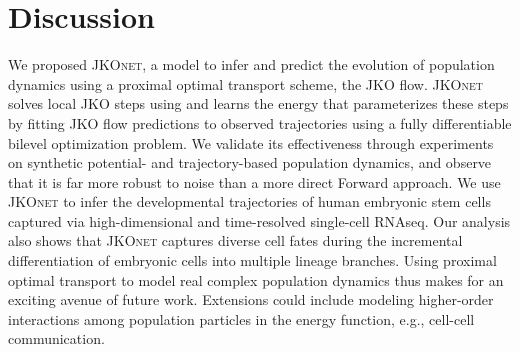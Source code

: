 \section{Discussion}
We proposed \textsc{JKOnet}, a model to infer and predict the evolution of population dynamics using a proximal optimal transport scheme, the \acrshort{JKO} flow.
\textsc{JKOnet} solves local \acrshort{JKO} steps using  and learns the energy that parameterizes these steps by fitting \acrshort{JKO} flow predictions to observed trajectories using a fully differentiable bilevel optimization problem.
We validate its effectiveness through experiments on synthetic potential- and trajectory-based population dynamics, and observe that it is far more robust to noise than a more direct Forward approach. We use \textsc{JKOnet} to infer the developmental trajectories of human embryonic stem cells captured via high-dimensional and time-resolved single-cell RNAseq. 
Our analysis also shows that \textsc{JKOnet} captures diverse cell fates during the incremental differentiation of embryonic cells into multiple lineage branches.
Using proximal optimal transport to model real complex population dynamics thus makes for an exciting avenue of future work. Extensions could include modeling higher-order interactions among population particles in the energy function, e.g., cell-cell communication.
